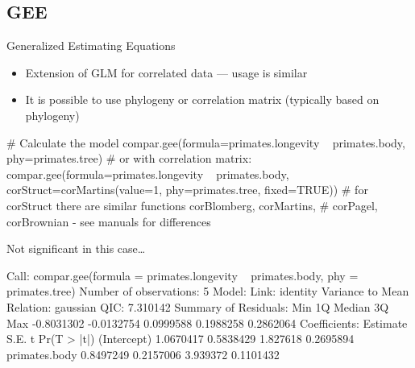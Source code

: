 \documentclass[compress, ucs, xelatex, 11pt, xcolor=svgnames,
  hyperref={
    bookmarks=true,
    unicode=true,
    colorlinks=true,
    pdftitle={Molecular data in R},
    plainpages=false,
    pdfauthor={Vojtech Zeisek},
    pdfsubject={Course about phylogeny and evolution in R},
    pdfcreator={XeLaTeX},
    pdfkeywords={R, evolution, phylogeny, molecular data},
    linkcolor=Tomato,
    anchorcolor=SaddleBrown,
    citecolor=Goldenrod,
    filecolor=DarkMagenta,
    menucolor=Sienna,
    urlcolor=DarkTurquoise,
    pdftex},
  url={hyphens, lowtilde} %
  ]{beamer}
\begin{document}
\subsection{GEE}

\begin{frame}[fragile]{Generalized Estimating Equations}
  \begin{itemize}
    \item Extension of GLM for correlated data --- usage is similar
    \item It is possible to use phylogeny or correlation matrix (typically based on phylogeny)
  \end{itemize}
  \vfil
  \begin{spluscode}
    # Calculate the model
    compar.gee(formula=primates.longevity ~ primates.body,
      phy=primates.tree)
    # or with correlation matrix:
    compar.gee(formula=primates.longevity ~ primates.body,
      corStruct=corMartins(value=1, phy=primates.tree, fixed=TRUE))
    # for corStruct there are similar functions corBlomberg, corMartins,
    # corPagel, corBrownian - see manuals for differences
  \end{spluscode}
\end{frame}

\begin{frame}[fragile]{Not significant in this case\ldots}
  \begin{spluscode}
    Call: compar.gee(formula = primates.longevity ~
      primates.body, phy = primates.tree)
    Number of observations: 5
    Model:
                         Link: identity
    Variance to Mean Relation: gaussian
    QIC: 7.310142
    Summary of Residuals:
           Min         1Q     Median         3Q        Max
    -0.8031302 -0.0132754  0.0999588  0.1988258  0.2862064
    Coefficients:
                   Estimate      S.E.        t Pr(T > |t|)
    (Intercept)   1.0670417 0.5838429 1.827618   0.2695894
    primates.body 0.8497249 0.2157006 3.939372   0.1101432
  \end{spluscode}
\end{frame}

%
\end{document}
